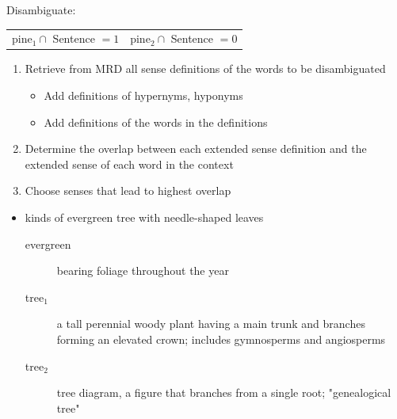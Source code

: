 \documentclass[a4paper,landscape,headrule,footrule,xetex]{foils}
\begin{document}
Disambiguate: \\[1ex] 

\begin{tabular}[rcl]{ll}
  pine$_1 \cap$ Sentence $= 1$ &   pine$_2 \cap$ Sentence $= 0$ \\
\end{tabular}


\begin{enumerate}
\item Retrieve from MRD all sense definitions of the words to be disambiguated
  \begin{itemize}
  \item Add definitions of hypernyms, hyponyms
  \item Add definitions of the words in the definitions
  \end{itemize}
\item Determine the overlap between each extended sense definition and
  the extended sense of each word in the context
\item Choose senses that lead to highest overlap
\end{enumerate}

\begin{itemize}
\item kinds of evergreen tree with needle-shaped leaves
  \begin{description}
  \item[evergreen] bearing  foliage throughout the year
  \item[tree$_1$] a  tall perennial woody plant having a main trunk and branches forming an elevated crown; includes gymnosperms and angiosperms
  \item[tree$_2$] tree diagram, a figure that branches from a single root; "genealogical tree"

  \end{description}
\end{itemize}
\end{document}

